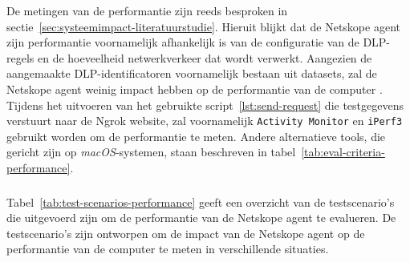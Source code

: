 

De metingen van de performantie zijn reeds besproken in sectie~\ref{sec:systeemimpact-literatuurstudie}.
Hieruit blijkt dat de Netskope agent zijn performantie voornamelijk afhankelijk is van de configuratie van de DLP-regels en de hoeveelheid netwerkverkeer dat wordt verwerkt.
Aangezien de aangemaakte DLP-identificatoren voornamelijk bestaan uit datasets, zal de Netskope agent weinig impact hebben op de performantie van de computer \autocite{Netskope2025Utilization}.
Tijdens het uitvoeren van het gebruikte script~\ref{lst:send-request} die testgegevens verstuurt naar de Ngrok website, zal voornamelijk \texttt{Activity Monitor} en \texttt{iPerf3} gebruikt worden om de performantie te meten.
Andere alternatieve tools, die gericht zijn op \textit{macOS}-systemen, staan beschreven in tabel~\ref{tab:eval-criteria-performance}.



\subsubsection{}
\label{sec:testscenario's}

Tabel~\ref{tab:test-scenarios-performance} geeft een overzicht van de testscenario's die uitgevoerd zijn om de performantie van de Netskope agent te evalueren. 
De testscenario's zijn ontworpen om de impact van de Netskope agent op de performantie van de computer te meten in verschillende situaties. 

